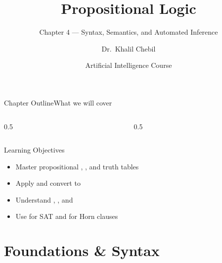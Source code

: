 \documentclass[aspectratio=169,11pt]{beamer}
\title[Ch.\,4 — Propositional Logic]{Propositional Logic}
\subtitle{Chapter 4 — Syntax, Semantics, and Automated Inference}
\author{Dr.\ Khalil Chebil}
\date{Artificial Intelligence Course}
\begin{document}
{
\begin{frame}
  \titlepage
\end{frame}}

\begin{frame}{Chapter Outline}{What we will cover}
  \begin{columns}[T]
    \begin{column}{0.5\textwidth}
      \tableofcontents[sections={1-3}]
    \end{column}
    \begin{column}{0.5\textwidth}
      \tableofcontents[sections={4-5}]
    \end{column}
  \end{columns}
  \vfill
  \begin{block}{Learning Objectives}
    \begin{itemize}
      \item Master propositional , , and truth tables
      \item Apply  and convert to 
      \item Understand , , and 
      \item Use  for SAT and  for Horn clauses
    \end{itemize}
  \end{block}
\end{frame}

\section{Foundations \& Syntax}
\end{document}
